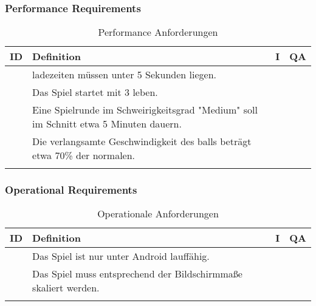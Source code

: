 \subsubsection{Performance Requirements}
\renewcommand{\CAT}{P}
\begin{xltabular}{\textwidth}{|l|X|r|r|}
    \hline
    \textbf{ID} & \textbf{Definition}   & \textbf{I}    & \textbf{QA}                                           \\
    \hline

    \setSystem{\ref*{sys:gen}}   %

     & \gls{ladezeiten} müssen unter 5 Sekunden liegen.        &     &      \\ \hline

    \setSystem{\ref*{sys:ls}}   %

     & Das Spiel startet mit 3 \gls{leben}.             &     &      \\ \hline

    \setSystem{\ref*{sys:cm}}   %

     & Eine Spielrunde im Schweirigkeitsgrad "Medium" soll im Schnitt etwa 5 Minuten dauern.             &      &      \\ \hline
     & Die verlangsamte Geschwindigkeit des \glspl{ball} beträgt etwa 70\% der normalen. &   &    \\ \hline

    \caption{Performance Anforderungen}\label{tab:performance-requirements}
\end{xltabular}

\subsubsection{Operational Requirements}
\renewcommand{\CAT}{O}
\begin{xltabular}{\textwidth}{|l|X|r|r|}
    \hline
    \textbf{ID} & \textbf{Definition}   & \textbf{I}    & \textbf{QA}                                           \\
    \hline

    \setSystem{\ref*{sys:gen}}  %

     & Das Spiel ist nur unter Android lauffähig.               &      &      \\ \hline
    
    \setSystem{\ref*{sys:ui}}   %

     & Das Spiel muss entsprechend der Bildschirmmaße skaliert werden.             &      &      \\ \hline
    
    \caption{Operationale Anforderungen}\label{tab:operational-requirements}
\end{xltabular}
